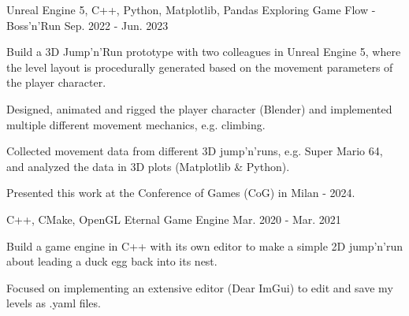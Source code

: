 \begin{cventries}
  \cventry
    {Unreal Engine 5, C++, Python, Matplotlib, Pandas} %
    {Exploring Game Flow - Boss'n'Run} %
    {\href{https://brandnerkasper.itch.io/bossn-run}{\faGamepad}} %
    {Sep. 2022 - Jun. 2023} %
    {
      \begin{cvitems} %
        \item {Build a 3D Jump'n'Run prototype with two colleagues in Unreal Engine 5, where the level layout is procedurally generated based on the movement parameters of the player character.}
        \item {Designed, animated and rigged the player character (Blender) and implemented multiple different movement mechanics, e.g. climbing.}
        \item {Collected movement data from different 3D jump'n'runs, e.g. Super Mario 64, and analyzed the data in 3D plots (Matplotlib \& Python).}%
        \item {Presented this work at the Conference of Games (CoG) in Milan - 2024.}
      \end{cvitems}
    }
    

  \cventry
    {C++, CMake, OpenGL} %
    {Eternal Game Engine} %
    {\href{https://github.com/BrandnerKasper/Eternal}{\faGithubSquare}} %
    {Mar. 2020 - Mar. 2021} %
    {
      \begin{cvitems} %
        \item {Build a game engine in C++ with its own editor to make a simple 2D jump'n'run about leading a duck egg back into its nest.}
        \item {Focused on implementing an extensive editor (Dear ImGui) to edit and save my levels as .yaml files.}
      \end{cvitems}
    }

\end{cventries}
